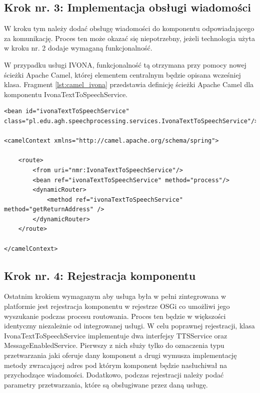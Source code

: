 \subsection {Krok nr. 3: Implementacja obsługi wiadomości}

W kroku tym należy dodać obsługę wiadomości do komponentu odpowiadającego za komunikację. Proces ten może okazać się niepotrzebny, jeżeli technologia użyta w kroku nr. 2 dodaje wymaganą funkcjonalność.

W przypadku usługi IVONA, funkcjonalność tą otrzymana przy pomocy nowej ścieżki Apache Camel, której elementem centralnym będzie opisana wcześniej klasa. Fragment \ref{lst:camel_ivona} przedstawia definicję ścieżki Apache Camel dla komponentu IvonaTextToSpeechService.

\lstset{language=XML, tabsize=4, caption=Ścieżka Apache Camel dla komponentu IvonaTextToSpeechService.,label=lst:camel_ivona}

\begin{center}
\begin{lstlisting}
<bean id="ivonaTextToSpeechService" class="pl.edu.agh.speechprocessing.services.IvonaTextToSpeechService"/>

<camelContext xmlns="http://camel.apache.org/schema/spring">

	<route>
		<from uri="nmr:IvonaTextToSpeechService"/>
		<bean ref="ivonaTextToSpeechService" method="process"/>
		<dynamicRouter>
			<method ref="ivonaTextToSpeechService" method="getReturnAddress" />
		</dynamicRouter>
	</route>

</camelContext>
\end{lstlisting}
\end{center}

\subsection {Krok nr. 4: Rejestracja komponentu}

Ostatnim krokiem wymaganym aby usługa była w pełni zintegrowana w platformie jest rejestracja komponentu w rejestrze OSGi co umożliwi jego wyszukanie podczas procesu routowania. Proces ten będzie w większości identyczny niezależnie od integrowanej usługi.
W celu poprawnej rejestracji, klasa IvonaTextToSpeechService implementuje dwa interfejsy TTSService oraz MessageEnabledService. Pierwszy z nich służy tylko do oznaczenia typu przetwarzania jaki oferuje dany komponent a drugi wymusza implementację metody zwracającej adres pod którym komponent będzie nasłuchiwał na przychodzące wiadomości. Dodatkowo, podczas rejestracji należy podać parametry przetwarzania, które są obsługiwane przez daną usługę.

